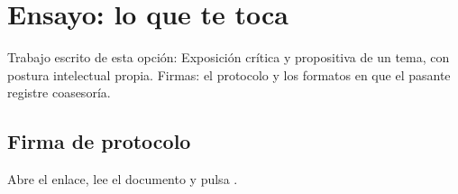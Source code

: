 \section{Ensayo: lo que te toca}
Trabajo escrito de esta opción: Exposición crítica y propositiva de un tema, con postura intelectual propia. Firmas: el protocolo y los formatos en que el pasante registre coasesoría.
\subsection{Firma de protocolo}
Abre el enlace, lee el documento y pulsa .
